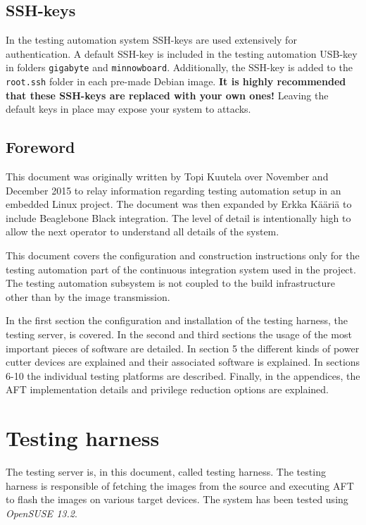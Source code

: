 \documentclass[a4paper,11pt]{article}
\newcommand{\cmd}[1]{\texttt{#1}}
\begin{document}
\subsection{SSH-keys}
In the testing automation system SSH-keys are used extensively for authentication. A default SSH-key is included in the testing automation USB-key in folders \cmd{gigabyte} and \cmd{minnowboard}. Additionally, the SSH-key is added to the \cmd{\/root\/.ssh} folder in each pre-made Debian image. \textbf{It is highly recommended that these SSH-keys are replaced with your own ones!} Leaving the default keys in place may expose your system to attacks.

\subsection{Foreword}
This document was originally written by Topi Kuutela over November and December 2015 to relay information regarding testing automation setup in an embedded Linux project. The document was then expanded by Erkka Kääriä to include Beaglebone Black integration. The level of detail is intentionally high to allow the next operator to understand all details of the system. 

This document covers the configuration and construction instructions only for the testing automation part of the continuous integration system used in the project. The testing automation subsystem is not coupled to the build infrastructure other than by the image transmission.

In the first section the configuration and installation of the testing harness, the testing server, is covered. In the second and third sections the usage of the most important pieces of software are detailed. In section 5 the different kinds of power cutter devices are explained and their associated software is explained. In sections 6-10 the individual testing platforms are described. Finally, in the appendices, the AFT implementation details and privilege reduction options are explained.

\section{Testing harness}
\label{testingharness}
The testing server is, in this document, called testing harness. The testing harness is responsible of fetching the images from the source and executing AFT to flash the images on various target devices. The system has been tested using \emph{OpenSUSE 13.2}.
\end{document}
